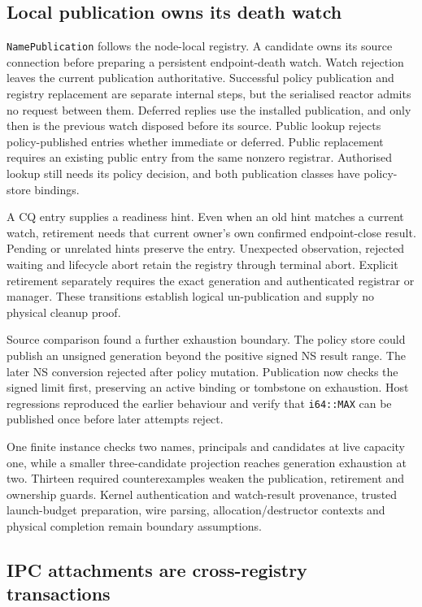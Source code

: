 \subsection{Local publication owns its death watch}

\texttt{NamePublication} follows the node-local registry. A candidate
owns its source connection before preparing a persistent endpoint-death watch.
Watch rejection leaves the current publication authoritative. Successful policy
publication and registry replacement are separate internal steps, but the serialised
reactor admits no request between them. Deferred replies use the installed
publication, and only then is the previous watch disposed before its source.
Public lookup rejects policy-published entries whether immediate or deferred.
Public replacement requires an existing public entry from the same nonzero
registrar. Authorised lookup still needs its policy decision, and both publication
classes have policy-store bindings.

A CQ entry supplies a readiness hint. Even when an old hint matches a current
watch, retirement needs that current owner's own confirmed endpoint-close
result. Pending or unrelated hints preserve the entry. Unexpected observation,
rejected waiting and lifecycle abort retain the registry through terminal abort.
Explicit retirement separately requires the exact generation and authenticated
registrar or manager. These transitions establish logical un-publication and
supply no physical cleanup proof.

Source comparison found a further exhaustion boundary. The policy store could
publish an unsigned generation beyond the positive signed NS result range.
The later NS conversion rejected after policy mutation. Publication now
checks the signed limit first, preserving an active binding or tombstone on
exhaustion. Host regressions reproduced the earlier behaviour and verify that
\texttt{i64::MAX} can be published once before later attempts reject.

One finite instance checks two names, principals and candidates at live capacity
one, while a smaller three-candidate projection reaches generation exhaustion at two.
Thirteen required counterexamples weaken the publication, retirement and ownership
guards. Kernel authentication and watch-result provenance, trusted launch-budget
preparation, wire parsing, allocation/destructor contexts and physical completion
remain boundary assumptions.

\subsection{IPC attachments are cross-registry transactions}

